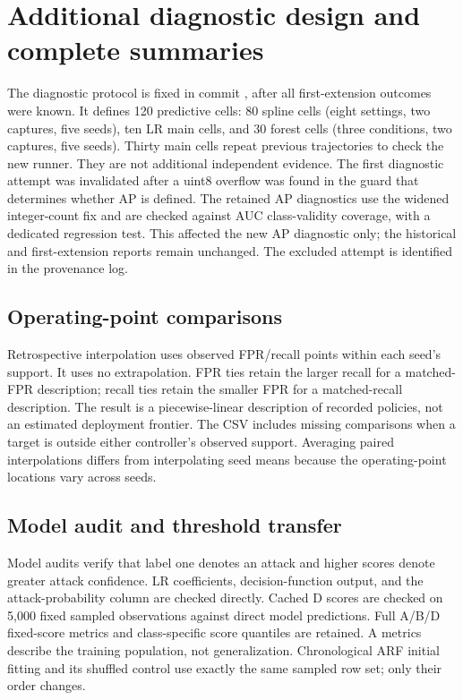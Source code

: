 \section{Additional diagnostic design and complete summaries}
\label{sec:review2}
The diagnostic protocol is fixed in commit , after all first-extension outcomes were known. It defines 120 predictive cells: 80 spline cells (eight settings, two captures, five seeds), ten LR main cells, and 30 forest cells (three conditions, two captures, five seeds). Thirty main cells repeat previous trajectories to check the new runner. They are not additional independent evidence. The first diagnostic attempt was invalidated after a uint8 overflow was found in the guard that determines whether AP is defined. The retained AP diagnostics use the widened integer-count fix and are checked against AUC class-validity coverage, with a dedicated regression test. This affected the new AP diagnostic only; the historical and first-extension reports remain unchanged. The excluded attempt is identified in the provenance log.

\subsection{Operating-point comparisons}
Retrospective interpolation uses observed FPR/recall points within each seed's support. It uses no extrapolation. FPR ties retain the larger recall for a matched-FPR description; recall ties retain the smaller FPR for a matched-recall description. The result is a piecewise-linear description of recorded policies, not an estimated deployment frontier. The CSV includes missing comparisons when a target is outside either controller's observed support. Averaging paired interpolations differs from interpolating seed means because the operating-point locations vary across seeds.



\subsection{Model audit and threshold transfer}
Model audits verify that label one denotes an attack and higher scores denote greater attack confidence. LR coefficients, decision-function output, and the attack-probability column are checked directly. Cached D scores are checked on 5,000 fixed sampled observations against direct model predictions. Full A/B/D fixed-score metrics and class-specific score quantiles are retained. A metrics describe the training population, not generalization. Chronological ARF initial fitting and its shuffled control use exactly the same sampled row set; only their order changes.

